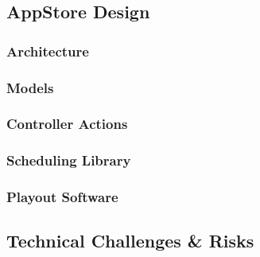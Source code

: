﻿\documentclass[a4paper, titlepage]{article}
\begin{document}
\subsection{AppStore Design}


\subsubsection{Architecture}


\subsubsection{Models}



\subsubsection{Controller Actions}




\subsubsection{Scheduling Library}


\subsubsection{Playout Software}




\subsection{Technical Challenges \& Risks}
\end{document}
